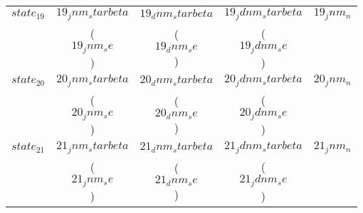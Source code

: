 {\begin{tabular}{l*{4}{c}}
$$state_19$$ \hspace{15mm} & $$19_jnm_starbeta$$ & $$19_dnm_starbeta$$ & $$19_jdnm_starbeta$$ & $$19_jnm_n$$ \\
                           & ($$19_jnm_se$$)     & ($$19_dnm_se$$)     & ($$19_jdnm_se$$)                    \\[2.5mm]
\hline

$$state_20$$\hspace{15mm} & $$20_jnm_starbeta$$ & $$20_dnm_starbeta$$ & $$20_jdnm_starbeta$$ & $$20_jnm_n$$ \\
                          & ($$20_jnm_se$$)     & ($$20_dnm_se$$)     & ($$20_jdnm_se$$)                    \\[2.5mm]
\hline

$$state_21$$ \hspace{15mm} & $$21_jnm_starbeta$$ & $$21_dnm_starbeta$$ & $$21_jdnm_starbeta$$ & $$21_jnm_n$$ \\
                           & ($$21_jnm_se$$)     & ($$21_dnm_se$$)     & ($$21_jdnm_se$$)                    \\[2.5mm]
\hline


\end{tabular}}

